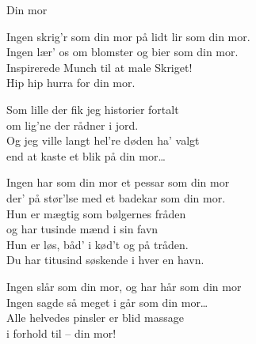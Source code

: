 \begin{song}{Din mor}
  \begin{SBVerse}
    Ingen skrig’r som din mor på lidt lir som din mor.\\
    Ingen lær’ os om blomster og bier som din mor.\\
    Inspirerede Munch til at male Skriget!\\
    Hip hip hurra for din mor.
  \end{SBVerse}

  \begin{SBSection*}
    Som lille der fik jeg historier fortalt\\
    om lig’ne der rådner i jord.\\
    Og jeg ville langt hel’re døden ha’ valgt\\
    end at kaste et blik på din mor\ldots
  \end{SBSection*}

  \begin{SBVerse}
    Ingen har som din mor et pessar som din mor\\
    der’ på stør’lse med et badekar som din mor.\\
    Hun er mægtig som bølgernes fråden\\
    og har tusinde mænd i sin favn\\
    Hun er løs, båd’ i kød’t og på tråden.\\
    Du har titusind søskende i hver en havn.
  \end{SBVerse}

  \begin{SBVerse}
    Ingen slår som din mor, og har hår som din mor\\
    Ingen sagde så meget i går som din mor\ldots\\
    Alle helvedes pinsler er blid massage\\
    i forhold til – din mor!
  \end{SBVerse}
\end{song}